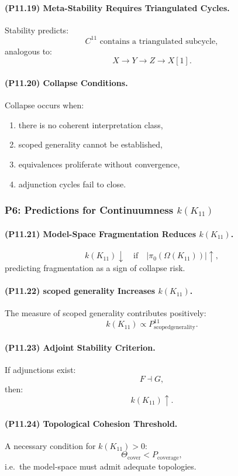 \paragraph{(P11.19) Meta-Stability Requires Triangulated Cycles.}
Stability predicts:
\[
C^{11} \text{ contains a triangulated subcycle},
\]
analogous to:
\[
X \to Y \to Z \to X[1].
\]

\paragraph{(P11.20) Collapse Conditions.}
Collapse occurs when:
\begin{enumerate}
    \item there is no coherent interpretation class,
    \item scoped generality cannot be established,
    \item equivalences proliferate without convergence,
    \item adjunction cycles fail to close.
\end{enumerate}

\subsubsection{P6: Predictions for Continuumness $k(K_{11})$}

\paragraph{(P11.21) Model-Space Fragmentation Reduces $k(K_{11})$.}
\[
k(K_{11}) \downarrow \quad\text{if}\quad
|\pi_0(\Omega(K_{11}))| \uparrow,
\]
predicting fragmentation as a sign of collapse risk.

\paragraph{(P11.22) scoped generality Increases $k(K_{11})$.}
The measure of scoped generality contributes positively:
\[
k(K_{11}) \propto 
P_{\mathrm{scoped generality}}^{11}.
\]

\paragraph{(P11.23) Adjoint Stability Criterion.}
If adjunctions exist:
\[
F \dashv G,
\]
then:
\[
k(K_{11}) \uparrow.
\]

\paragraph{(P11.24) Topological Cohesion Threshold.}
A necessary condition for $k(K_{11}) > 0$:
\[
\Theta_{\mathrm{cover}} < P_{\mathrm{coverage}},
\]
i.e.\ the model-space must admit adequate topologies.

